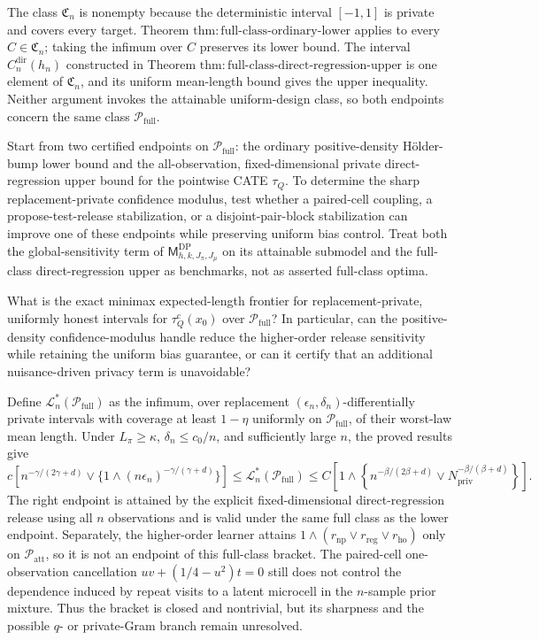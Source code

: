 The class \(\mathfrak C_n\) is nonempty because the deterministic interval \([-1,1]\) is private and covers every target.  Theorem \(\mathrm{thm{:}full\text{-}class\text{-}ordinary\text{-}lower}\) applies to every \(C\in\mathfrak C_n\); taking the infimum over \(C\) preserves its lower bound.  The interval \(C_n^{\mathrm{dir}}(h_n)\) constructed in Theorem \(\mathrm{thm{:}full\text{-}class\text{-}direct\text{-}regression\text{-}upper}\) is one element of \(\mathfrak C_n\), and its uniform mean-length bound gives the upper inequality.  Neither argument invokes the attainable uniform-design class, so both endpoints concern the same class \(\mathcal P_{\mathrm{full}}\).

Start from two certified endpoints on \(\mathcal P_{\mathrm{full}}\): the ordinary positive-density H\"older-bump lower bound and the all-observation, fixed-dimensional private direct-regression upper bound for the pointwise CATE \(\tau_Q\).  To determine the sharp replacement-private confidence modulus, test whether a paired-cell coupling, a propose-test-release stabilization, or a disjoint-pair-block stabilization can improve one of these endpoints while preserving uniform bias control.  Treat both the global-sensitivity term of \(\mathsf M_{h,k,J_\pi,J_\mu}^{\mathrm{DP}}\) on its attainable submodel and the full-class direct-regression upper as benchmarks, not as asserted full-class optima.

What is the exact minimax expected-length frontier for replacement-private, uniformly honest intervals for \(\tau_Q^{\mathrm c}(x_0)\) over \(\mathcal P_{\mathrm{full}}\)? In particular, can the positive-density confidence-modulus handle reduce the higher-order release sensitivity while retaining the uniform bias guarantee, or can it certify that an additional nuisance-driven privacy term is unavoidable?

Define \(\mathcal L_n^*(\mathcal P_{\mathrm{full}})\) as the infimum, over replacement \((\epsilon_n,\delta_n)\)-differentially private intervals with coverage at least \(1-\eta\) uniformly on \(\mathcal P_{\mathrm{full}}\), of their worst-law mean length.  Under \(L_\pi\ge\kappa\), \(\delta_n\le c_0/n\), and sufficiently large \(n\), the proved results give
\[
 c\left[n^{-\gamma/(2\gamma+d)}
 \vee\{1\wedge(n\epsilon_n)^{-\gamma/(\gamma+d)}\}\right]
 \le\mathcal L_n^*(\mathcal P_{\mathrm{full}})
 \le C\left[1\wedge\left\{n^{-\beta/(2\beta+d)}
 \vee N_{\mathrm{priv}}^{-\beta/(\beta+d)}\right\}\right].
\]
The right endpoint is attained by the explicit fixed-dimensional direct-regression release using all \(n\) observations and is valid under the same full class as the lower endpoint.  Separately, the higher-order learner attains \(1\wedge(r_{\mathrm{np}}\vee r_{\mathrm{reg}}\vee r_{\mathrm{ho}})\) only on \(\mathcal P_{\mathrm{att}}\), so it is not an endpoint of this full-class bracket.  The paired-cell one-observation cancellation \(uv+(1/4-u^2)t=0\) still does not control the dependence induced by repeat visits to a latent microcell in the \(n\)-sample prior mixture.  Thus the bracket is closed and nontrivial, but its sharpness and the possible \(q\)- or private-Gram branch remain unresolved.
